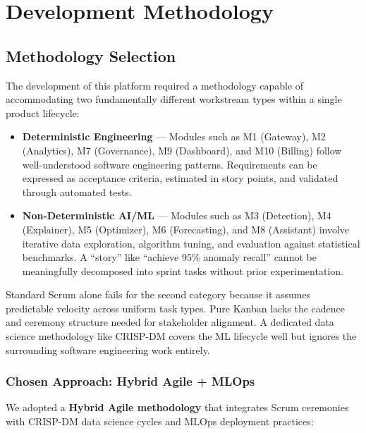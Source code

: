 \documentclass[12pt,a4paper,twoside]{report}
\begin{document}
\chapter{Development Methodology}

\section{Methodology Selection}

The development of this platform required a methodology capable of accommodating two fundamentally different workstream types within a single product lifecycle:

\begin{itemize}
  \item \textbf{Deterministic Engineering} — Modules such as M1 (Gateway), M2 (Analytics), M7 (Governance), M9 (Dashboard), and M10 (Billing) follow well-understood software engineering patterns. Requirements can be expressed as acceptance criteria, estimated in story points, and validated through automated tests.

  \item \textbf{Non-Deterministic AI/ML} — Modules such as M3 (Detection), M4 (Explainer), M5 (Optimizer), M6 (Forecasting), and M8 (Assistant) involve iterative data exploration, algorithm tuning, and evaluation against statistical benchmarks. A ``story'' like ``achieve 95\% anomaly recall'' cannot be meaningfully decomposed into sprint tasks without prior experimentation.
\end{itemize}

Standard Scrum alone fails for the second category because it assumes predictable velocity across uniform task types. Pure Kanban lacks the cadence and ceremony structure needed for stakeholder alignment. A dedicated data science methodology like CRISP-DM covers the ML lifecycle well but ignores the surrounding software engineering work entirely.

\subsection{Chosen Approach: Hybrid Agile + MLOps}

We adopted a \textbf{Hybrid Agile methodology} that integrates Scrum ceremonies with CRISP-DM data science cycles and MLOps deployment practices:
\end{document}
